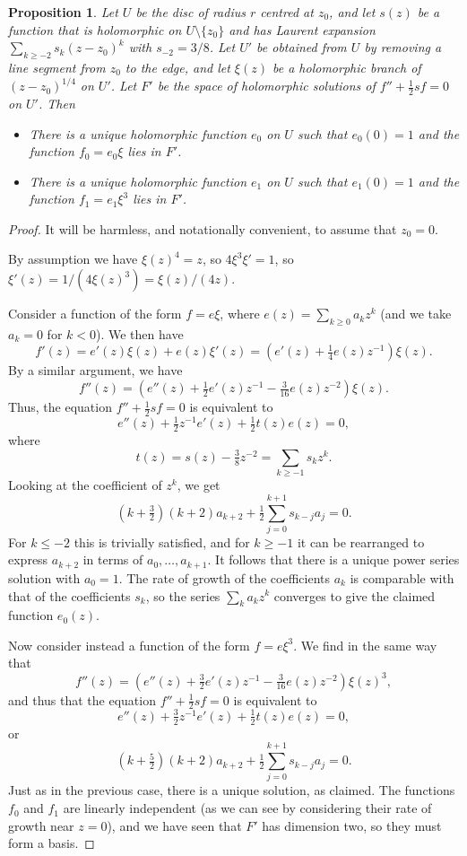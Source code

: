 \documentclass[reqno]{amsart}
\newcommand{\sm}        {\setminus}
\newcommand{\half}      {\tfrac{1}{2}}
\renewcommand{\:}{\colon}
\newtheorem{proposition}[theorem]{Proposition}
\theoremstyle{definition}
\begin{document}
\begin{proposition}
 Let $U$ be the disc of radius $r$ centred at $z_0$, and let $s(z)$ be
 a function that is holomorphic on $U\sm\{z_0\}$ and has Laurent
 expansion $\sum_{k\geq -2}s_k(z-z_0)^k$ with $s_{-2}=3/8$.  Let $U'$
 be obtained from $U$ by removing a line segment from $z_0$ to the
 edge, and let $\xi(z)$ be a holomorphic branch of $(z-z_0)^{1/4}$ on
 $U'$.  Let $F'$ be the space of holomorphic solutions of
 $f''+\half sf=0$ on $U'$.  Then
 \begin{itemize}
  \item There is a unique holomorphic function $e_0$ on $U$ such that
   $e_0(0)=1$ and the function $f_0=e_0\xi$ lies in $F'$.
  \item There is a unique holomorphic function $e_1$ on $U$ such that
   $e_1(0)=1$ and the function $f_1=e_1\xi^3$ lies in $F'$.
 \end{itemize}
\end{proposition}
\begin{proof}
 It will be harmless, and notationally convenient, to assume that
 $z_0=0$.

 By assumption we have $\xi(z)^4=z$, so $4\xi^3\xi'=1$, so
 $\xi'(z)=1/(4\xi(z)^3)=\xi(z)/(4z)$.

 Consider a function of the form $f=e\xi$, where
 $e(z)=\sum_{k\geq 0}a_kz^k$ (and we take $a_k=0$ for $k<0$).  We then have
 \[ f'(z)=e'(z)\xi(z)+e(z)\xi'(z)=(e'(z)+\tfrac{1}{4}e(z)z^{-1})\xi(z). \]
 By a similar argument, we have
 \[ f''(z) =
     (e''(z) + \tfrac{1}{2}e'(z)z^{-1} -
     \tfrac{3}{16}e(z)z^{-2})\xi(z).
 \]
 Thus, the equation $f''+\half sf=0$ is equivalent to
 \[ e''(z) + \half z^{-1} e'(z) + \half t(z) e(z) = 0, \]
 where
 \[ t(z) = s(z) - \tfrac{3}{8} z^{-2} = \sum_{k\geq -1}s_kz^k. \]
 Looking at the coefficient of $z^k$, we get
 \[ (k+\tfrac{3}{2})(k+2) a_{k+2} +
      \half\sum_{j=0}^{k+1}s_{k-j}a_j = 0.
 \]
 For $k\leq -2$ this is trivially satisfied, and for $k\geq -1$ it can be
 rearranged to express $a_{k+2}$ in terms of $a_0,\dotsc,a_{k+1}$.  It
 follows that there is a unique power series solution with $a_0=1$.
 The rate of growth of the coefficients $a_k$ is comparable with that
 of the coefficients $s_k$, so the series $\sum_ka_kz^k$ converges to
 give the claimed function $e_0(z)$.

 Now consider instead a function of the form $f=e\xi^3$.  We find in
 the same way that
 \[ f''(z) =
     (e''(z) + \tfrac{3}{2}e'(z)z^{-1} -
     \tfrac{3}{16}e(z)z^{-2})\xi(z)^3,
 \]
 and thus that the equation $f''+\half sf=0$ is equivalent to
 \[ e''(z) + \tfrac{3}{2} z^{-1} e'(z) + \half t(z) e(z) = 0, \]
 or
 \[ (k+\tfrac{5}{2})(k+2) a_{k+2} +
      \half\sum_{j=0}^{k+1}s_{k-j}a_j = 0.
 \]
 Just as in the previous case, there is a unique solution, as
 claimed.  The functions $f_0$ and $f_1$ are linearly independent (as
 we can see by considering their rate of growth near $z=0$), and we
 have seen that $F'$ has dimension two, so they must form a basis.
\end{proof}
\end{document}

